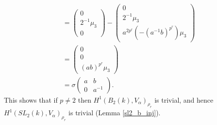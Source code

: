 \begin{align*}
	&=
	\left(\begin{matrix}0\\2^{-1}\mu_3\\0\end{matrix}\right)
	-
	\left(\begin{matrix}0\\2^{-1}\mu_3\\a^{2p^r}(-(a^{-1}b)^{p^r})\mu_3\end{matrix}\right) \\
	&=\left(\begin{matrix}0\\0\\(ab)^{p^r}\mu_3\end{matrix}\right) \\
	&= \sigma\left(\begin{matrix}a & b\\0 & a^{-1}\end{matrix}\right).
\end{align*}
This shows that if $p\neq 2$ then $H^1(B_2(k), V_\alpha)_{\rho_r}$ is trivial, and hence $H^1(SL_2(k), V_\alpha)_{\rho_r}$ is trivial (Lemma \ref{sl2_b_inj}).

